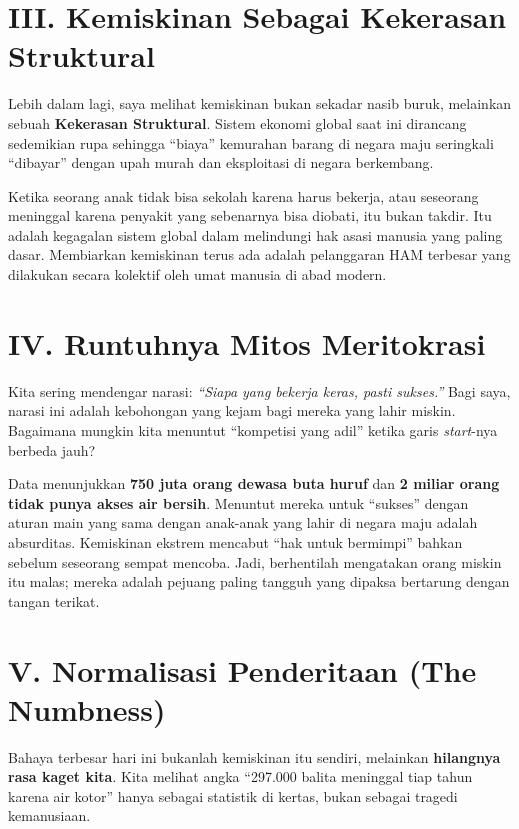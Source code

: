\documentclass[
  letterpaper,
  DIV=11,
  numbers=noendperiod]{scrreprt}
\begin{document}
\section{III. Kemiskinan Sebagai Kekerasan
Struktural}\label{iii.-kemiskinan-sebagai-kekerasan-struktural}

Lebih dalam lagi, saya melihat kemiskinan bukan sekadar nasib buruk,
melainkan sebuah \textbf{Kekerasan Struktural}. Sistem ekonomi global
saat ini dirancang sedemikian rupa sehingga ``biaya'' kemurahan barang
di negara maju seringkali ``dibayar'' dengan upah murah dan eksploitasi
di negara berkembang.

Ketika seorang anak tidak bisa sekolah karena harus bekerja, atau
seseorang meninggal karena penyakit yang sebenarnya bisa diobati, itu
bukan takdir. Itu adalah kegagalan sistem global dalam melindungi hak
asasi manusia yang paling dasar. Membiarkan kemiskinan terus ada adalah
pelanggaran HAM terbesar yang dilakukan secara kolektif oleh umat
manusia di abad modern.

\section{IV. Runtuhnya Mitos
Meritokrasi}\label{iv.-runtuhnya-mitos-meritokrasi}

Kita sering mendengar narasi: \emph{``Siapa yang bekerja keras, pasti
sukses.''} Bagi saya, narasi ini adalah kebohongan yang kejam bagi
mereka yang lahir miskin. Bagaimana mungkin kita menuntut ``kompetisi
yang adil'' ketika garis \emph{start}-nya berbeda jauh?

Data menunjukkan \textbf{750 juta orang dewasa buta huruf} dan \textbf{2
miliar orang tidak punya akses air bersih}. Menuntut mereka untuk
``sukses'' dengan aturan main yang sama dengan anak-anak yang lahir di
negara maju adalah absurditas. Kemiskinan ekstrem mencabut ``hak untuk
bermimpi'' bahkan sebelum seseorang sempat mencoba. Jadi, berhentilah
mengatakan orang miskin itu malas; mereka adalah pejuang paling tangguh
yang dipaksa bertarung dengan tangan terikat.

\section{V. Normalisasi Penderitaan (The
Numbness)}\label{v.-normalisasi-penderitaan-the-numbness}

Bahaya terbesar hari ini bukanlah kemiskinan itu sendiri, melainkan
\textbf{hilangnya rasa kaget kita}. Kita melihat angka ``297.000 balita
meninggal tiap tahun karena air kotor'' hanya sebagai statistik di
kertas, bukan sebagai tragedi kemanusiaan.
\end{document}
